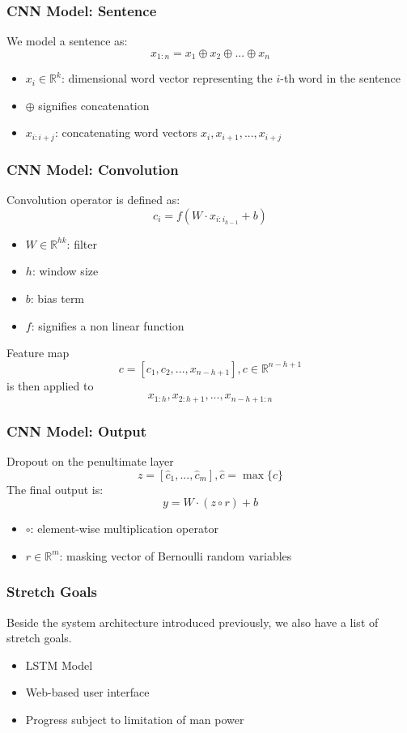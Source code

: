 \documentclass{beamer}
\begin{document}
\begin{frame}
\frametitle{CNN Model: Sentence}
    We model a sentence as:
    $$x_{1:n} = x_1 \oplus x_2 \oplus ... \oplus x_n$$
    \begin{itemize}
        \item $x_{i} \in \mathbb{R}^k$: dimensional word vector representing the $i$-th word in the sentence
        \item $\oplus$ signifies concatenation
        \item $x_{i:i+j}$: concatenating word vectors $x_i, x_{i+1}, ... , x_{i+j}$
    \end{itemize}
\end{frame}

\begin{frame}
\frametitle{CNN Model: Convolution}
    Convolution operator is defined as:
    $$c_i = f(W \cdot x_{i:i_{h-1}} + b)$$
    \begin{itemize}
        \item $W \in \mathbb{R}^{hk}$: filter
        \item $h$: window size
        \item $b$: bias term
        \item $f$: signifies a non linear function
    \end{itemize}
    Feature map
    $$c = [c_1, c_2, ... ,x_{n-h+1}], c \in \mathbb{R}^{n-h+1}$$
    is then applied to 
    $$x_{1:h}, x_{2:h+1}, ... ,x_{n-h+1:n}$$
\end{frame}

\begin{frame}
\frametitle{CNN Model: Output}
    Dropout on the penultimate layer 
    $$z = [\hat{c}_1,...,\hat{c}_m], \hat{c}=\operatorname{max}\{c\}$$
    The final output is:
    $$y = W \cdot (z \circ r) + b$$
    \begin{itemize}
    \item $\circ$: element-wise multiplication operator
    \item $r \in \mathbb{R}^m$: masking vector of Bernoulli random variables
    \end{itemize}
\end{frame}

\begin{frame}
\frametitle{Stretch Goals}
    Beside the system architecture introduced previously, we also have a
    list of stretch goals.
    \begin{itemize}
        \item LSTM Model
        \item Web-based user interface
        \item Progress subject to limitation of man power
    \end{itemize}
\end{frame}
\end{document}
